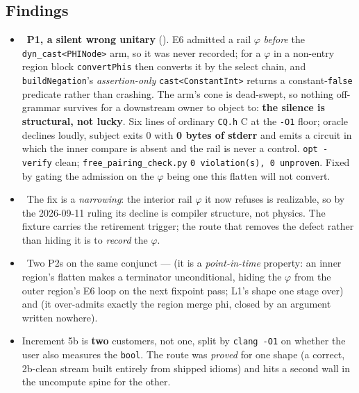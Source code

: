 \subsection*{Findings}
\begin{itemize}
  \item \fconfirmed\ \textbf{P1, a silent wrong unitary} (). E6 admitted a
        rail \(\varphi\) \emph{before} the \texttt{dyn\_cast<PHINode>} arm, so it was never
        recorded; for a \(\varphi\) in a non-entry region block \texttt{convertPhis} then
        converts it by the select chain, and \texttt{buildNegation}'s \emph{assertion-only}
        \texttt{cast<ConstantInt>} returns a constant-\texttt{false} predicate rather than
        crashing. The arm's cone is dead-swept, so nothing off-grammar survives for a
        downstream owner to object to: \textbf{the silence is structural, not lucky}. Six lines
        of ordinary \texttt{CQ.h} C at the \texttt{-O1} floor; oracle declines loudly, subject
        exits 0 with \textbf{0 bytes of stderr} and emits a circuit in which the inner compare
        is absent and the rail is never a control. \texttt{opt -verify} clean;
        \texttt{free\_pairing\_check.py} \texttt{0 violation(s), 0 unproven}. Fixed by gating the
        admission on the \(\varphi\) being one this flatten will not convert.
  \item \foverdecline\ The fix is a \emph{narrowing}: the interior rail \(\varphi\) it now refuses
        is realizable, so by the 2026-09-11 ruling its decline is compiler structure, not
        physics. The fixture carries the retirement trigger; the route that removes the defect
        rather than hiding it is to \emph{record} the \(\varphi\).
  \item \fconfirmed\ Two P2s on the same conjunct ---  (it is a
        \emph{point-in-time} property: an inner region's flatten makes a terminator
        unconditional, hiding the \(\varphi\) from the outer region's E6 loop on the next
        fixpoint pass; L1's shape one stage over) and  (it
        over-admits exactly the region merge phi, closed by an argument written nowhere).
  \item Increment 5b is \textbf{two} customers, not one, split by \texttt{clang -O1} on whether
        the user also measures the \texttt{bool}. The route was \emph{proved} for one shape
        (a correct, 2b-clean stream built entirely from shipped idioms) and hits a second wall
        in the uncompute spine for the other.
\end{itemize}

